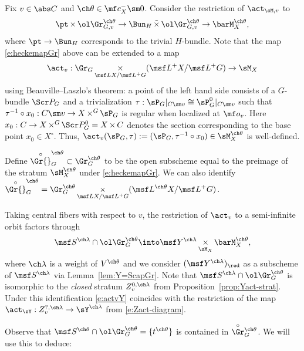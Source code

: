 \documentclass[final]{amsart}
\theoremstyle{remark}
\theoremstyle{definition}
\DeclareMathOperator*{\ttimes}{\tilde\times}
\DeclareMathOperator*{\xt}{\times}
\numberwithin{equation}{section}
\begin{document}
Fix $v\in \abs C$ and $\ch\theta \in \mf c_X^- \sm 0$. 
Consider the restriction of $\act_{\sM,v}$ to 
\begin{equation} \label{e:heckemapGr}
    \pt \xt \ol\Gr^{\ch\theta}_{G,v} \to \Bun_H \ttimes \ol\Gr^{\ch\theta}_{G,v} 
\to \barM_X^{\ch\theta}, 
\end{equation}
where $\pt \to \Bun_H$ corresponds to the trivial $H$-bundle. 
Note that the map \eqref{e:heckemapGr} above can be 
extended to a map 
\begin{equation}\label{e:actHG}
    \act_{v} : \Gr_G \xt_{\msf L X/\msf L^+G} (\msf L^+X/\msf L^+G) \to \sM_X
\end{equation}
using Beauville--Laszlo's theorem: a point of the left hand side 
consists of a $G$-bundle $\Scr P_G$ and a trivialization 
$\tau : \sP_G|_{C\sm v} \cong \sP_G^0|_{C\sm v}$ such that 
$\tau^{-1} \circ x_0 : C\sm v \to X \xt^G \sP_G$ is regular when localized at $\mf o_v$. 
Here $x_0 : C \to X \xt^G \Scr P_G^0 = X \xt C$ denotes the section corresponding to
the base point $x_0\in X^\circ$.  
Thus, $\act_{v}(\sP_G,\tau) := (\sP_G, \tau^{-1}\circ x_0) \in \sM_X^{\ch\theta}$
is well-defined. 

Define $\overset\circ\Gr{}^{\ch\theta}_G \subset \Gr^{\ch\theta}_G$ to be the 
open subscheme equal to the preimage 
of the stratum $\sM_X^{\ch\theta}$ under \eqref{e:heckemapGr}. 
We can also identify
$\displaystyle \overset\circ\Gr{}_G^{\ch\theta} = \Gr^{\ch\theta}_G \xt_{\msf L X/\msf L^+G} (\msf L^{\ch\theta}X / \msf L^+G)$.


Taking central fibers with respect to $v$, 
the restriction of $\act_v$ to a semi-infinite orbit
factors through 
\begin{equation}
 \label{e:actvY}
 \msf S^{\ch\lambda} \cap \ol\Gr^{\ch\theta}_G \into \msf Y^{\ch\lambda}\xt_{\sM_X} \barM_X^{\ch\theta}, 
\end{equation}
where $\ch\lambda$ is a weight of $V^{\ch\theta}$
and we consider $(\msf Y^{\ch\lambda})_\red$ as a subscheme of $\msf S^{\ch\lambda}$ via
Lemma~\ref{lem:Y=ScapGr}.
Note that $\msf S^{\ch\lambda}\cap\ol\Gr_G^{\ch\theta}$ is isomorphic to 
the \emph{closed} stratum $Z_v^{0,\ch\lambda}$ from Proposition~\ref{prop:Yact-strat}.
Under this identification \eqref{e:actvY} coincides with the restriction of the map $\act_\sY:Z_v^{?,\ch\lambda}\to \sY^{\ch\lambda}$ from \eqref{e:Zact-diagram}.

Observe that $\msf S^{\ch\theta} \cap \ol\Gr^{\ch\theta}_G = \{ t^{\ch\theta} \}$ 
is contained in $\overset\circ{\Gr}{}^{\ch\theta}_G$. 
We will use this to deduce: 
\end{document}
